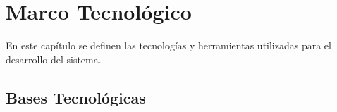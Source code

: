 \chapter{Marco Tecnológico}
En este capítulo se definen las tecnologías y herramientas utilizadas para el desarrollo del sistema.

\section{Bases Tecnológicas}

